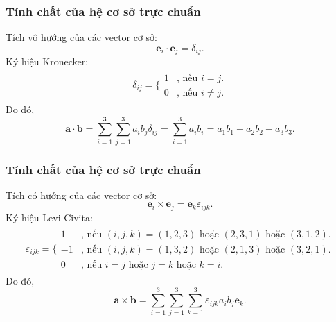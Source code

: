 \begin{frame}
    \frametitle{Tính chất của hệ cơ sở trực chuẩn}
    Tích vô hướng của các vector cơ sở:
    \begin{equation*}
    \mathbf{e}_i \cdot \mathbf{e}_j =\delta_{ij}.
\end{equation*}Ký hiệu Kronecker: \begin{equation*}
\begin{array}{l}
     \delta_{ij}=\Bigg\{
    \begin{array}{ll}
      1  & \text{, nếu } i=j. \\
      0  & \text{, nếu } i\neq j.
    \end{array}
\end{array}
\end{equation*}
Do đó,
\begin{equation}
    \mathbf{a}\cdot\mathbf{b}= \sum_{i=1}^{3}\sum_{j=1}^{3}a_i b_j \delta_{ij}= \sum_{i=1}^{3} a_i b_i = a_1 b_1 + a_2 b_2 + a_3 b_3.
\end{equation}
\end{frame}
\begin{frame}
    \frametitle{Tính chất của hệ cơ sở trực chuẩn}
    Tích có hướng của các vector cơ sở:
    \begin{equation*}
        \mathbf{e}_i \times\mathbf{e}_j =\mathbf{e}_k \varepsilon_{ijk}.
    \end{equation*}
    Ký hiệu Levi-Civita:
    \begin{equation*}
\begin{array}{l}
        \varepsilon_{ijk}=\Bigg\{
        \begin{array}{ll}
        1  & \text{, nếu } (i,j,k)=(1,2,3) \text{ hoặc } (2,3,1) \text{ hoặc } (3,1,2).\\
        -1 & \text{, nếu } (i,j,k)=(1,3,2) \text{ hoặc } (2,1,3) \text{ hoặc } (3,2,1).\\
        0  & \text{, nếu } i=j \text{ hoặc } j=k \text{ hoặc } k=i.
        \end{array}
\end{array}
\end{equation*}
Do đó, 
\begin{equation}
    \mathbf{a} \times \mathbf{b} = \sum_{i=1}^{3}\sum_{j=1}^{3}\sum_{k=1}^{3}\varepsilon_{ijk} a_i b_j  \mathbf{e}_k.
\end{equation}
\end{frame}